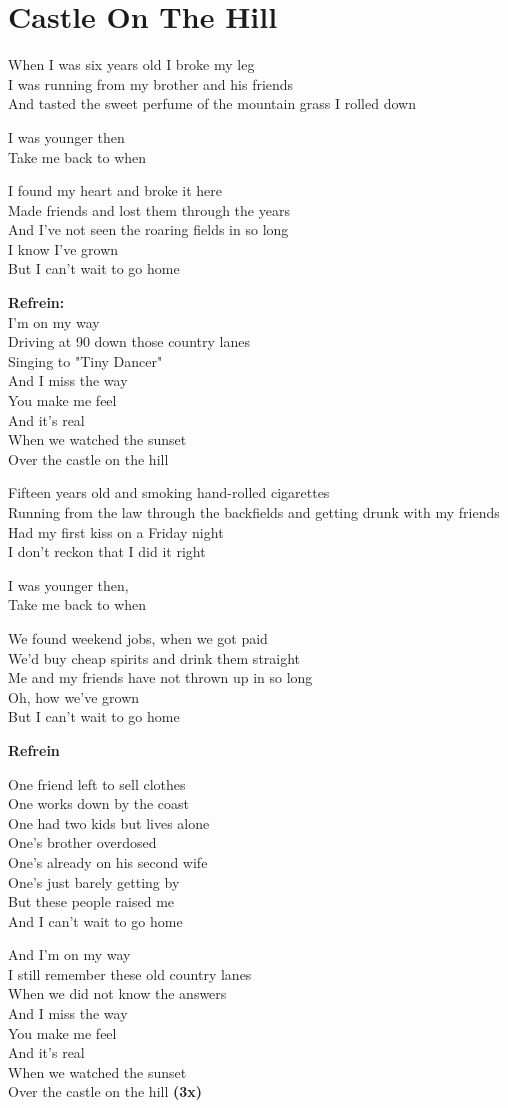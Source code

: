 \section{Castle On The Hill}
When I was six years old I broke my leg\\
I was running from my brother and his friends\\
And tasted the sweet perfume of the mountain grass I rolled down

I was younger then\\
Take me back to when

I found my heart and broke it here\\
Made friends and lost them through the years\\
And I've not seen the roaring fields in so long\\
I know I've grown\\
But I can't wait to go home

\textbf{Refrein:}\\
I'm on my way\\
Driving at 90 down those country lanes\\
Singing to "Tiny Dancer"\\
And I miss the way\\
You make me feel\\
And it's real\\
When we watched the sunset\\
Over the castle on the hill

Fifteen years old and smoking hand-rolled cigarettes\\
Running from the law through the backfields and getting drunk with my friends\\
Had my first kiss on a Friday night\\
I don't reckon that I did it right

I was younger then,\\
Take me back to when

We found weekend jobs, when we got paid\\
We'd buy cheap spirits and drink them straight\\
Me and my friends have not thrown up in so long\\
Oh, how we've grown\\
But I can't wait to go home

\textbf{Refrein}

One friend left to sell clothes\\
One works down by the coast\\
One had two kids but lives alone\\
One's brother overdosed\\
One's already on his second wife\\
One's just barely getting by\\
But these people raised me\\
And I can't wait to go home

And I'm on my way\\
I still remember these old country lanes\\
When we did not know the answers\\
And I miss the way\\
You make me feel\\
And it's real\\
When we watched the sunset\\
Over the castle on the hill \textbf{(3x)}\\
